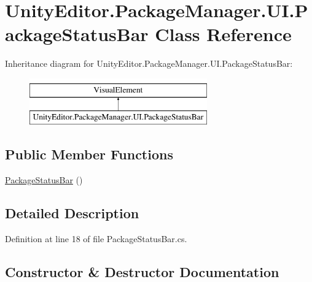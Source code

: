 \hypertarget{class_unity_editor_1_1_package_manager_1_1_u_i_1_1_package_status_bar}{}\section{Unity\+Editor.\+Package\+Manager.\+U\+I.\+Package\+Status\+Bar Class Reference}
\label{class_unity_editor_1_1_package_manager_1_1_u_i_1_1_package_status_bar}
Inheritance diagram for Unity\+Editor.\+Package\+Manager.\+U\+I.\+Package\+Status\+Bar\+:\begin{figure}[H]
\begin{center}
\leavevmode
\includegraphics[height=2.000000cm]{class_unity_editor_1_1_package_manager_1_1_u_i_1_1_package_status_bar}
\end{center}
\end{figure}
\subsection*{Public Member Functions}
\begin{DoxyCompactItemize}
\item 
\mbox{\hyperlink{class_unity_editor_1_1_package_manager_1_1_u_i_1_1_package_status_bar_a7472387bc58a83d2c98107e127c506c4}{Package\+Status\+Bar}} ()
\end{DoxyCompactItemize}


\subsection{Detailed Description}


Definition at line 18 of file Package\+Status\+Bar.\+cs.



\subsection{Constructor \& Destructor Documentation}
\mbox{\label{class_unity_editor_1_1_package_manager_1_1_u_i_1_1_package_status_bar_a7472387bc58a83d2c98107e127c506c4}} 
